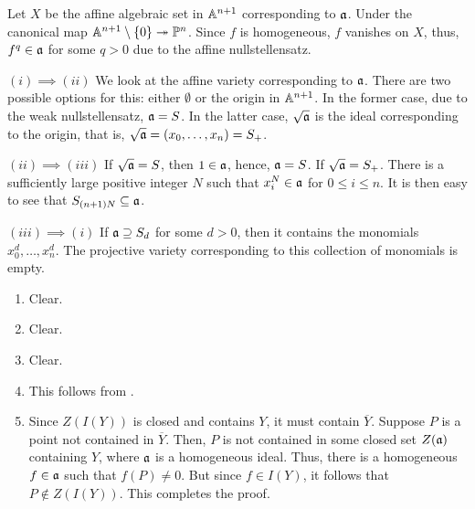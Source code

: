 \begin{exercise}
    Let $X$ be the affine algebraic set in $\mathbb{A}^{n + 1}$ corresponding to $\mathfrak{a}$. Under the canonical map $\mathbb{A}^{n + 1}\setminus\{0\}\twoheadrightarrow\mathbb{P}^n$. Since $f$ is homogeneous, $f$ vanishes on $X$, thus, $f^q\in\mathfrak{a}$ for some $q > 0$ due to the affine nullstellensatz.
\end{exercise}

\begin{exercise}
    $(i)\implies(ii)$ We look at the affine variety corresponding to $\mathfrak{a}$. There are two possible options for this: either $\emptyset$ or the origin in $\mathbb{A}^{n + 1}$. In the former case, due to the weak nullstellensatz, $\mathfrak{a} = S$. In the latter case, $\sqrt{\mathfrak{a}}$ is the ideal corresponding to the origin, that is, $\sqrt{\mathfrak{a}} = (x_0,\dots,x_n) = S_+$.

    $(ii)\implies(iii)$ If $\sqrt{\mathfrak{a}} = S$, then $1\in\mathfrak{a}$, hence, $\mathfrak{a} = S$. If $\sqrt{\mathfrak{a}} = S_+$. There is a sufficiently large positive integer $N$ such that $x_i^N\in\mathfrak{a}$ for $0\le i\le n$. It is then easy to see that $S_{(n + 1)N}\subseteq\mathfrak{a}$.

    $(iii)\implies(i)$ If $\mathfrak{a}\supseteq S_d$ for some $d > 0$, then it contains the monomials $x_0^d,\dots, x_n^d$. The projective variety corresponding to this collection of monomials is empty.
\end{exercise}

\begin{exercise}
\begin{enumerate}[label=(\alph*)]
    \item Clear.
    \item Clear.
    \item Clear.
    \item This follows from .
    \item Since $Z(I(Y))$ is closed and contains $Y$, it must contain $\overline Y$. Suppose $P$ is a point not contained in $\overline Y$. Then, $P$ is not contained in some closed set $Z(\mathfrak{a})$ containing $Y$, where $\mathfrak{a}$ is a homogeneous ideal. Thus, there is a homogeneous $f\in\mathfrak{a}$ such that $f(P)\ne 0$. But since $f\in I(Y)$, it follows that $P\notin Z(I(Y))$. This completes the proof.
\end{enumerate}
\end{exercise}

